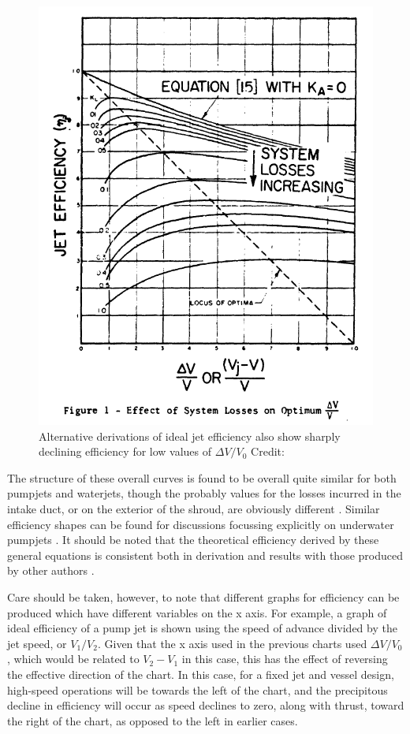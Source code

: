 \documentclass{article}\usepackage[]{graphicx}\usepackage[]{color}
\begin{document}
\begin{figure}
\includegraphics[width=\textwidth]{EfficiencyBrandau.png}
\caption{Alternative derivations of ideal jet efficiency also show sharply declining efficiency for low values of $\Delta V / V_0$ Credit: \cite{brandau1967}}
\label{fig:EfficiencyBrandau.png}
\end{figure}

The structure of these overall curves is found to be overall quite similar for both pumpjets and waterjets, though the probably values for the losses incurred in the intake duct, or on the exterior of the shroud, are obviously different \parencite[13-14]{wislicenus1973}.  Similar efficiency shapes can be found for discussions focussing explicitly on underwater pumpjets \parencite[13]{henderson1964}. It should be noted that the theoretical efficiency derived by these general equations is consistent both in derivation and results with those produced by other authors \parencite[227]{lewis1988}.

Care should be taken, however, to note that different graphs for efficiency can be produced which have different variables on the x axis.  For example, \cite[247]{mollard2011} a graph of ideal efficiency of a pump jet is shown using the speed of advance divided by the jet speed, or $V_1/V_2$.  Given that the x axis used in the previous charts used $\Delta V / V_0$, which would be related to $V_2-V_1$ in this case, this has the effect of reversing the effective direction of the chart. In this case, for a fixed jet and vessel design, high-speed operations will be towards the left of the chart, and the precipitous decline in efficiency will occur as speed declines to zero, along with thrust, toward the right of the chart, as opposed to the left in earlier cases.
\end{document}
